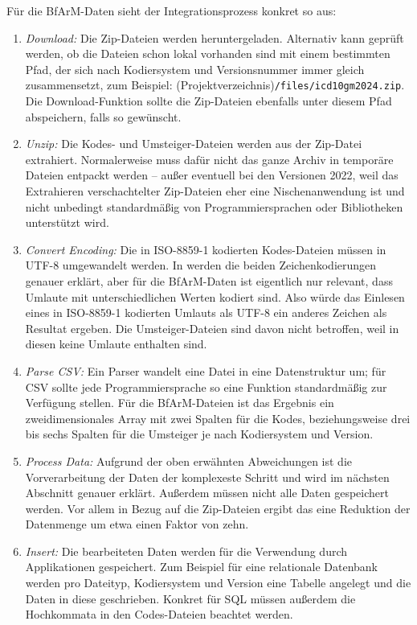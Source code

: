 Für die BfArM-Daten sieht der Integrationsprozess konkret so aus:

\begin{enumerate}
\item \emph{Download:} Die Zip-Dateien werden heruntergeladen. Alternativ kann geprüft werden, ob die Dateien schon lokal vorhanden sind mit einem bestimmten Pfad, der sich nach Kodiersystem und Versionsnummer immer gleich zusammensetzt, zum Beispiel: (Projektverzeichnis)\texttt{/files/icd10gm2024.zip}. Die Download-Funktion sollte die Zip-Dateien ebenfalls unter diesem Pfad abspeichern, falls so gewünscht.
\item \emph{Unzip:} Die Kodes- und Umsteiger-Dateien werden aus der Zip-Datei extrahiert. Normalerweise muss dafür nicht das ganze Archiv in temporäre Dateien entpackt werden -- außer eventuell bei den Versionen 2022, weil das Extrahieren verschachtelter Zip-Dateien eher eine Nischenanwendung ist und nicht unbedingt standardmäßig von Programmiersprachen oder Bibliotheken unterstützt wird. 
\item \emph{Convert Encoding:} Die in ISO-8859-1 kodierten Kodes-Dateien müssen in UTF-8 umgewandelt werden. In \cite{charencoding} werden die beiden Zeichenkodierungen genauer erklärt, aber für die BfArM-Daten ist eigentlich nur relevant, dass Umlaute mit unterschiedlichen Werten kodiert sind. Also würde das Einlesen eines in ISO-8859-1 kodierten Umlauts als UTF-8 ein anderes Zeichen als Resultat ergeben. Die Umsteiger-Dateien sind davon nicht betroffen, weil in diesen keine Umlaute enthalten sind. 
\item \emph{Parse CSV:} Ein Parser wandelt eine Datei in eine Datenstruktur um; für CSV sollte jede Programmiersprache so eine Funktion standardmäßig zur Verfügung stellen. Für die BfArM-Dateien ist das Ergebnis ein zweidimensionales Array mit zwei Spalten für die Kodes, beziehungsweise drei bis sechs Spalten für die Umsteiger je nach Kodiersystem und Version. 
\item \emph{Process Data:} Aufgrund der oben erwähnten Abweichungen ist die Vorverarbeitung der Daten der komplexeste Schritt und wird im nächsten Abschnitt genauer erklärt. Außerdem müssen nicht alle Daten gespeichert werden. Vor allem in Bezug auf die Zip-Dateien ergibt das eine Reduktion der Datenmenge um etwa einen Faktor von zehn. 
\item \emph{Insert:} Die bearbeiteten Daten werden für die Verwendung durch Applikationen gespeichert. Zum Beispiel für eine relationale Datenbank werden pro Dateityp, Kodiersystem und Version eine Tabelle angelegt und die Daten in diese geschrieben. Konkret für SQL müssen außerdem die Hochkommata in den Codes-Dateien beachtet werden. 
\end{enumerate}

